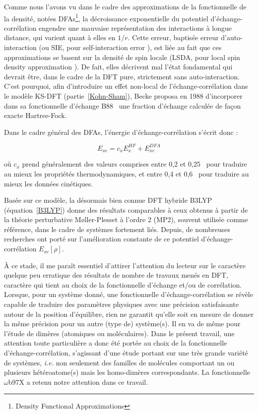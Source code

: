 	Comme nous l'avons vu dans le cadre des approximations de la fonctionnelle de la densité, notées DFAs\footnote{\og Density Functional Approximations \fg{} }, la décroissance exponentielle du potentiel d'échange-corrélation engendre une mauvaise représentation des interactions à longue distance, qui varient quant à elles en $1/r$. Cette erreur, baptisée erreur d'auto-interaction (ou SIE, pour \og self-interaction error \fg{}), est liée au fait que ces approximations se basent sur la densité de spin locale (LSDA, pour \og local spin density approximation \fg{}). De fait, elles décrivent mal l'état fondamental qui devrait être, dans le cadre de la DFT pure, strictement sans auto-interaction.     
	C'est pourquoi, afin d'introduire un effet non-local de l'échange-corrélation dans le modèle KS-DFT (partie~\ref{Kohn-Sham}), Becke proposa en 1988 d'incorporer dans sa fonctionnelle d'échange B88~\cite{becke1988density} une fraction d'échange calculée de façon exacte Hartree-Fock. 
	
	Dans le cadre général des DFAs, l'énergie d'échange-corrélation s'écrit donc :
	
	\begin{equation}
	E_{xc} = c_{x}E_{x}^{HF} + E_{xc}^{DFA}
	\label{xcB88}
	\end{equation}
	
	\noindent où $c_{x}$ prend généralement des valeurs comprises entre 0,2 et 0,25~\cite{becke1993density} pour traduire au mieux les propriétés thermodynamiques, et entre 0,4 et 0,6~\cite{boese2004development} pour traduire au mieux les données cinétiques.
	
	Basée sur ce modèle, la désormais bien connue DFT hybride B3LYP \cite{becke1993density} (équation~\ref{B3LYP}) donne des résultats comparables à ceux obtenus à partir de la théorie perturbative M\o ller-Plesset à l'ordre 2 \cite{moller1934note} (MP2), souvent utilisée comme référence, dans le cadre de systèmes fortement liés. Depuis, de nombreuses recherches ont porté sur l'amélioration constante de ce potentiel d'échange-corrélation $E_{xc}[\rho]$.
	
	À ce stade, il me paraît essentiel d'attirer l’attention du lecteur sur le caractère quelque peu \og erratique \fg{} des résultats de nombre de travaux menés en DFT, caractère qui tient au choix de la fonctionnelle d'échange et/ou de corrélation. 
	 Lorsque, pour un système donné, une fonctionnelle d’échange-corrélation se révèle capable de traduire des paramètres physiques avec une précision satisfaisante autour de la position d’équilibre, rien ne garantit qu’elle soit en mesure de donner la même précision pour un autre (type de) système(s). Il en va de même pour l’étude de dimères (atomiques ou moléculaires). Dans le présent travail, une attention toute particulière a donc été portée au choix de la fonctionnelle d’échange-corrélation, s'agissant d'une étude portant sur une très grande variété de systèmes, \textit{i.e.} non seulement des familles de molécules comportant un ou plusieurs hétéroatome(s) mais les homo-dimères correspondants. La fonctionnelle $\omega$b97X a retenu notre attention dans ce travail.
	
